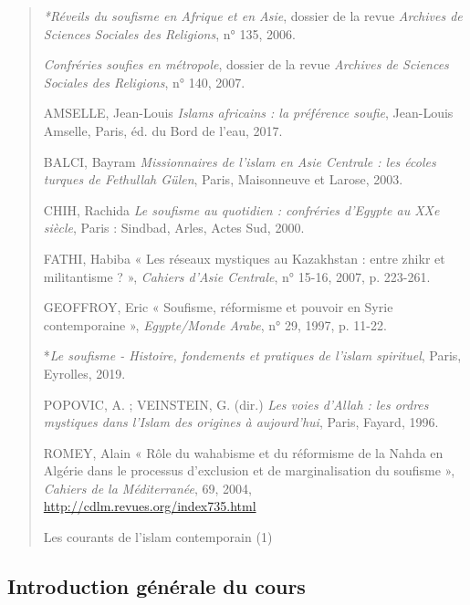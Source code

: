 \begin{quote}
\emph{*Réveils du soufisme en Afrique et en Asie}, dossier de la revue
\emph{Archives de Sciences Sociales des Religions}, n° 135, 2006.

\emph{Confréries soufies en métropole}, dossier de la revue
\emph{Archives de Sciences Sociales des Religions}, n° 140, 2007.

AMSELLE, Jean-Louis \emph{Islams africains : la préférence soufie},
Jean-Louis Amselle, Paris, éd. du Bord de l'eau, 2017.

BALCI, Bayram \emph{Missionnaires de l'islam en Asie Centrale : les
écoles turques de Fethullah Gülen}, Paris, Maisonneuve et Larose, 2003.

CHIH, Rachida \emph{Le soufisme au quotidien : confréries d'Egypte au
XXe siècle}, Paris : Sindbad, Arles, Actes Sud, 2000.

FATHI, Habiba « Les réseaux mystiques au Kazakhstan : entre zhikr et
militantisme ? », \emph{Cahiers d'Asie Centrale}, n° 15-16, 2007, p.
223-261.

GEOFFROY, Eric « Soufisme, réformisme et pouvoir en Syrie contemporaine
», \emph{Egypte/Monde Arabe}, n° 29, 1997, p. 11-22.

*\emph{Le soufisme - Histoire, fondements et pratiques de l'islam
spirituel}, Paris, Eyrolles, 2019.

POPOVIC, A. ; VEINSTEIN, G. (dir.) \emph{Les voies d'Allah : les ordres
mystiques dans l'Islam des origines à aujourd'hui}, Paris, Fayard, 1996.

ROMEY, Alain « Rôle du wahabisme et du réformisme de la Nahda en Algérie
dans le processus d'exclusion et de marginalisation du soufisme »,
\emph{Cahiers de la Méditerranée}, 69, 2004,
\url{http://cdlm.revues.org/index735.html}

Les courants de l'islam contemporain (1)
\end{quote}

\hypertarget{introduction-guxe9nuxe9rale-du-cours}{%
\subsection{Introduction générale du
cours}\label{introduction-guxe9nuxe9rale-du-cours}}

